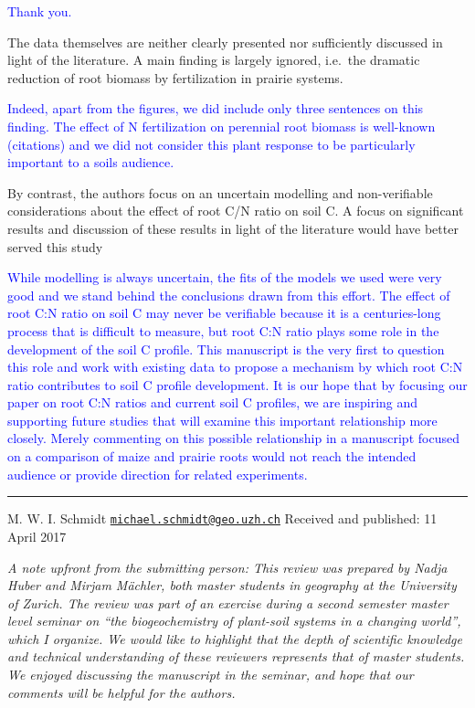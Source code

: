 \documentclass[]{article}
\begin{document}
\textcolor{blue}{Thank you.}

The data themselves are neither clearly presented nor sufficiently
discussed in light of the literature. A main finding is largely ignored,
i.e.~the dramatic reduction of root biomass by fertilization in prairie
systems.

\textcolor{blue}{Indeed, apart from the figures, we did include only three sentences on this finding. The effect of N fertilization on perennial root biomass is well-known (citations) and we did not consider this plant response to be particularly important to a soils audience.}

By contrast, the authors focus on an uncertain modelling and
non-verifiable considerations about the effect of root C/N ratio on soil
C. A focus on significant results and discussion of these results in
light of the literature would have better served this study

\textcolor{blue}{While modelling is always uncertain, the fits of the models we used were very good and we stand behind the conclusions drawn from this effort. The effect of root C:N ratio on soil C may never be verifiable because it is a centuries-long process that is difficult to measure, but root C:N ratio plays some role in the development of the soil C profile. This manuscript is the very first to question this role and work with existing data to propose a mechanism by which root C:N ratio contributes to soil C profile development. It is our hope that by focusing our paper on root C:N ratios and current soil C profiles, we are inspiring and supporting future studies that will examine this important relationship more closely. Merely commenting on this possible relationship in a manuscript focused on a comparison of maize and prairie roots would not reach the intended audience or provide direction for related experiments.}

\begin{center}\rule{0.5\linewidth}{\linethickness}\end{center}

M. W. I. Schmidt
\href{mailto:michael.schmidt@geo.uzh.ch}{\nolinkurl{michael.schmidt@geo.uzh.ch}}
Received and published: 11 April 2017

\emph{A note upfront from the submitting person: This review was
prepared by Nadja Huber and Mirjam Mächler, both master students in
geography at the University of Zurich. The review was part of an
exercise during a second semester master level seminar on ``the
biogeochemistry of plant-soil systems in a changing world'', which I
organize. We would like to highlight that the depth of scientific
knowledge and technical understanding of these reviewers represents that
of master students. We enjoyed discussing the manuscript in the seminar,
and hope that our comments will be helpful for the authors.}
\end{document}
